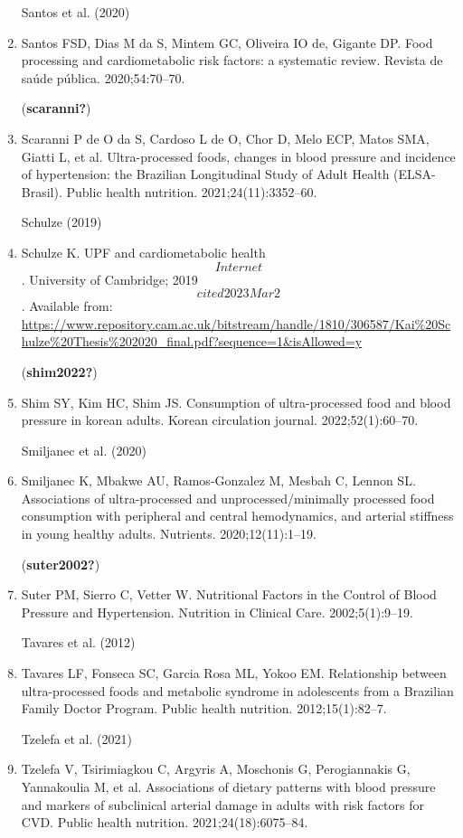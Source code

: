 \documentclass[
]{article}
\begin{document}
\begin{enumerate}
  Santos et al. (2020)
\item
  Santos FSD, Dias M da S, Mintem GC, Oliveira IO de, Gigante DP. Food
  processing and cardiometabolic risk factors: a systematic review.
  Revista de saúde pública. 2020;54:70--70.

  (\textbf{scaranni?})
\item
  Scaranni P de O da S, Cardoso L de O, Chor D, Melo ECP, Matos SMA,
  Giatti L, et al. Ultra-processed foods, changes in blood pressure and
  incidence of hypertension: the Brazilian Longitudinal Study of Adult
  Health (ELSA-Brasil). Public health nutrition. 2021;24(11):3352--60.

  Schulze (2019)
\item
  Schulze K. UPF and cardiometabolic health \[Internet\]. University of
  Cambridge; 2019 \[cited 2023 Mar 2\]. Available from:
  \url{https://www.repository.cam.ac.uk/bitstream/handle/1810/306587/Kai\%20Schulze\%20Thesis\%202020_final.pdf?sequence=1\&isAllowed=y}

  (\textbf{shim2022?})
\item
  Shim SY, Kim HC, Shim JS. Consumption of ultra-processed food and
  blood pressure in korean adults. Korean circulation journal.
  2022;52(1):60--70.

  Smiljanec et al. (2020)
\item
  Smiljanec K, Mbakwe AU, Ramos-Gonzalez M, Mesbah C, Lennon SL.
  Associations of ultra-processed and unprocessed/minimally processed
  food consumption with peripheral and central hemodynamics, and
  arterial stiffness in young healthy adults. Nutrients.
  2020;12(11):1--19.

  (\textbf{suter2002?})
\item
  Suter PM, Sierro C, Vetter W. Nutritional Factors in the Control of
  Blood Pressure and Hypertension. Nutrition in Clinical Care.
  2002;5(1):9--19.

  Tavares et al. (2012)
\item
  Tavares LF, Fonseca SC, Garcia Rosa ML, Yokoo EM. Relationship between
  ultra-processed foods and metabolic syndrome in adolescents from a
  Brazilian Family Doctor Program. Public health nutrition.
  2012;15(1):82--7.

  Tzelefa et al. (2021)
\item
  Tzelefa V, Tsirimiagkou C, Argyris A, Moschonis G, Perogiannakis G,
  Yannakoulia M, et al. Associations of dietary patterns with blood
  pressure and markers of subclinical arterial damage in adults with
  risk factors for CVD. Public health nutrition. 2021;24(18):6075--84.


\end{enumerate}
\end{document}

